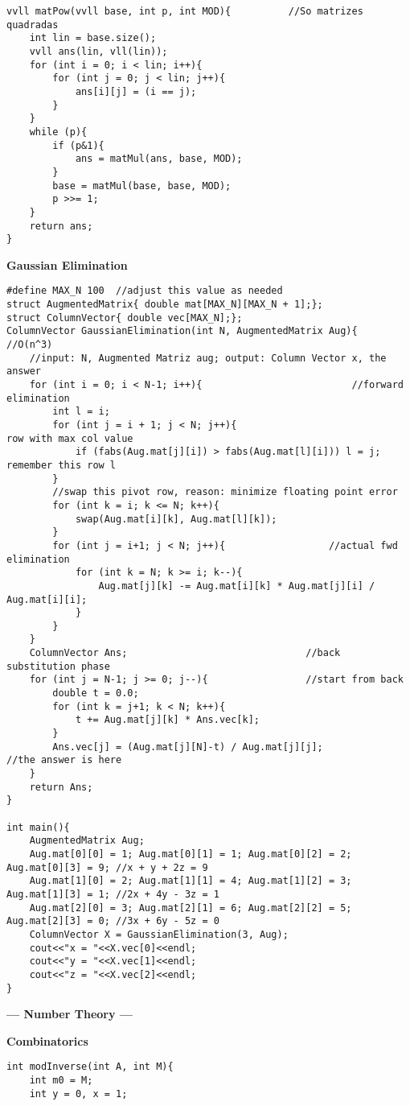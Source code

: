 \documentclass{article}
\begin{document}
\begin{multicols}{2}
\begin{lstlisting}
vvll matPow(vvll base, int p, int MOD){          //So matrizes quadradas
	int lin = base.size();
	vvll ans(lin, vll(lin));
	for (int i = 0; i < lin; i++){
		for (int j = 0; j < lin; j++){
			ans[i][j] = (i == j);
		}
	}
	while (p){
		if (p&1){
			ans = matMul(ans, base, MOD);
		}
		base = matMul(base, base, MOD);
		p >>= 1;
	}
	return ans;
}
\end{lstlisting}


\large
\huge\textbf{Gaussian Elimination}
\large
\begin{lstlisting}
#define MAX_N 100  //adjust this value as needed
struct AugmentedMatrix{ double mat[MAX_N][MAX_N + 1];};
struct ColumnVector{ double vec[MAX_N];};
ColumnVector GaussianElimination(int N, AugmentedMatrix Aug){    //O(n^3)
	//input: N, Augmented Matriz aug; output: Column Vector x, the answer
	for (int i = 0; i < N-1; i++){							//forward elimination
		int l = i;
		for (int j = i + 1; j < N; j++){										row with max col value
			if (fabs(Aug.mat[j][i]) > fabs(Aug.mat[l][i])) l = j;						remember this row l
		}
		//swap this pivot row, reason: minimize floating point error
		for (int k = i; k <= N; k++){
			swap(Aug.mat[i][k], Aug.mat[l][k]);
		}
		for (int j = i+1; j < N; j++){					//actual fwd elimination
			for (int k = N; k >= i; k--){
				Aug.mat[j][k] -= Aug.mat[i][k] * Aug.mat[j][i] / Aug.mat[i][i];
			}
		}
	}
	ColumnVector Ans;								//back substitution phase
	for (int j = N-1; j >= 0; j--){					//start from back
		double t = 0.0;
		for (int k = j+1; k < N; k++){
			t += Aug.mat[j][k] * Ans.vec[k];
		}
		Ans.vec[j] = (Aug.mat[j][N]-t) / Aug.mat[j][j];				//the answer is here
	}
	return Ans;
}

int main(){
	AugmentedMatrix Aug;
	Aug.mat[0][0] = 1; Aug.mat[0][1] = 1; Aug.mat[0][2] = 2; Aug.mat[0][3] = 9;	//x + y + 2z = 9
	Aug.mat[1][0] = 2; Aug.mat[1][1] = 4; Aug.mat[1][2] = 3; Aug.mat[1][3] = 1;	//2x + 4y - 3z = 1
	Aug.mat[2][0] = 3; Aug.mat[2][1] = 6; Aug.mat[2][2] = 5; Aug.mat[2][3] = 0;	//3x + 6y - 5z = 0
	ColumnVector X = GaussianElimination(3, Aug);
	cout<<"x = "<<X.vec[0]<<endl;
	cout<<"y = "<<X.vec[1]<<endl;
	cout<<"z = "<<X.vec[2]<<endl;
}
\end{lstlisting}

\large
\begin{center}
\huge\textbf{--- Number Theory ---}
\end{center}
\large

\large
\huge\textbf{Combinatorics}
\large
\begin{lstlisting}
int modInverse(int A, int M){
	int m0 = M;
	int y = 0, x = 1;


\end{lstlisting}
\end{multicols}
\end{document}
